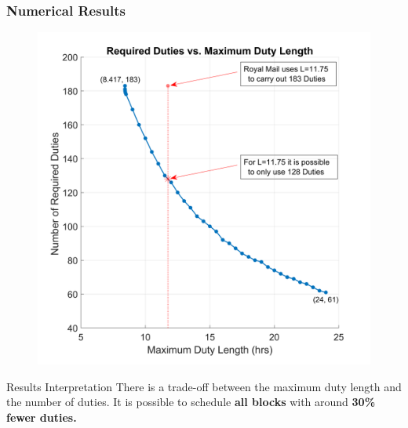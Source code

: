 \documentclass[handout]{beamer}
\begin{document}
\begin{frame}
	\frametitle{Numerical Results}
	\vspace{\baselineskip}
	\begin{figure}%
        \centering
        \includegraphics[width=0.4\linewidth]{Images/1-D1M2.png}
        \label{fig:1-D1M1}%
    \end{figure}
    
        \begin{block}{Results Interpretation}
		There is a trade-off between the maximum duty length and the number of duties. It is possible to schedule \textbf{all blocks} with around \textbf{30\% fewer duties.} 
	\end{block}
    	\vspace{\baselineskip}
    	\vspace{\baselineskip}
\end{frame}

\end{document}
